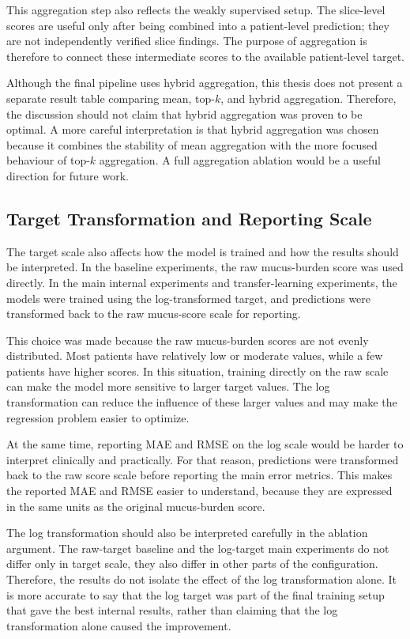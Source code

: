 This aggregation step also reflects the weakly supervised setup. The slice-level scores are useful only after being combined into a patient-level prediction; they are not independently verified slice findings. The purpose of aggregation is therefore to connect these intermediate scores to the available patient-level target.

Although the final pipeline uses hybrid aggregation, this thesis does not present a separate result table comparing mean, top-\(k\), and hybrid aggregation. Therefore, the discussion should not claim that hybrid aggregation was proven to be optimal. A more careful interpretation is that hybrid aggregation was chosen because it combines the stability of mean aggregation with the more focused behaviour of top-\(k\) aggregation. A full aggregation ablation would be a useful direction for future work.


\subsection{Target Transformation and Reporting Scale}
The target scale also affects how the model is trained and how the results should be interpreted. In the baseline experiments, the raw mucus-burden score was used directly. In the main internal experiments and transfer-learning experiments, the models were trained using the log-transformed target, and predictions were transformed back to the raw mucus-score scale for reporting.

This choice was made because the raw mucus-burden scores are not evenly distributed. Most patients have relatively low or moderate values, while a few patients have higher scores. In this situation, training directly on the raw scale can make the model more sensitive to larger target values. The log transformation can reduce the influence of these larger values and may make the regression problem easier to optimize.

At the same time, reporting MAE and RMSE on the log scale would be harder to interpret clinically and practically. For that reason, predictions were transformed back to the raw score scale before reporting the main error metrics. This makes the reported MAE and RMSE easier to understand, because they are expressed in the same units as the original mucus-burden score.

The log transformation should also be interpreted carefully in the ablation argument. The raw-target baseline and the log-target main experiments do not differ only in target scale, they also differ in other parts of the configuration. Therefore, the results do not isolate the effect of the log transformation alone. It is more accurate to say that the log target was part of the final training setup that gave the best internal results, rather than claiming that the log transformation alone caused the improvement.

